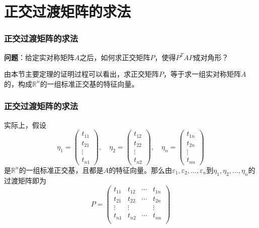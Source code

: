 \section{正交过渡矩阵的求法}


\begin{frame}
\frametitle{正交过渡矩阵的求法}

\begin{block}{}
{\bfseries 问题}：给定实对称矩阵$A$之后，如何求正交矩阵$P$，使得$P^TAP$成对角形？
\end{block}

\vspace{0.5em}
\pause

由本节主要定理的证明过程可以看出，求正交矩阵$P$，等于求一组实对称矩阵$A$的，构成$\mathbb{R}^n$的一组标准正交基的特征向量。

\end{frame}


\begin{frame}
\frametitle{正交过渡矩阵的求法}

实际上，假设
$$\eta_1 = \begin{pmatrix} t_{11} \\ t_{21} \\ \vdots \\ t_{n1} \end{pmatrix}, \quad \eta_2 = \begin{pmatrix} t_{12} \\ t_{22} \\ \vdots \\ t_{n2} \end{pmatrix}, \quad \eta_n = \begin{pmatrix} t_{1n} \\ t_{2n} \\ \vdots \\ t_{nn} \end{pmatrix}$$
是$\mathbb{R}^n$的一组标准正交基，且都是$A$的特征向量。那么由$\varepsilon_1, \varepsilon_2, \ldots, \varepsilon_n$到$\eta_1, \eta_2, \ldots, \eta_n$的过渡矩阵即为
$$P = \begin{pmatrix} t_{11} & t_{12} & \cdots & t_{1n} \\ t_{21} & t_{22} & \cdots & t_{2n} \\ \vdots & \vdots &  & \vdots \\ t_{n1} & t_{n2} & \cdots & t_{nn} \\\end{pmatrix}$$

\end{frame}

